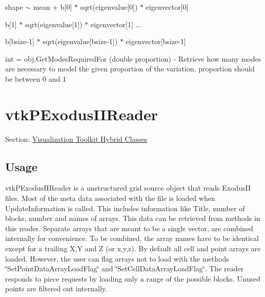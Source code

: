\begin{DoxyItemize}
shape $\sim$ mean + b\mbox{[}0\mbox{]} $\ast$ sqrt(eigenvalue\mbox{[}0\mbox{]}) $\ast$ eigenvector\mbox{[}0\mbox{]}
\begin{DoxyItemize}
\item b\mbox{[}1\mbox{]} $\ast$ sqrt(eigenvalue\mbox{[}1\mbox{]}) $\ast$ eigenvector\mbox{[}1\mbox{]} ...
\item b\mbox{[}bsize-\/1\mbox{]} $\ast$ sqrt(eigenvalue\mbox{[}bsize-\/1\mbox{]}) $\ast$ eigenvector\mbox{[}bsize-\/1\mbox{]}  
\end{DoxyItemize}
\item {\ttfamily int = obj.\-Get\-Modes\-Required\-For (double proportion)} -\/ Retrieve how many modes are necessary to model the given proportion of the variation. proportion should be between 0 and 1  
\end{DoxyItemize}\hypertarget{vtkhybrid_vtkpexodusiireader}{}\section{vtk\-P\-Exodus\-I\-I\-Reader}\label{vtkhybrid_vtkpexodusiireader}
Section\-: \hyperlink{sec_vtkhybrid}{Visualization Toolkit Hybrid Classes} \hypertarget{vtkwidgets_vtkxyplotwidget_Usage}{}\subsection{Usage}\label{vtkwidgets_vtkxyplotwidget_Usage}
vtk\-P\-Exodus\-I\-I\-Reader is a unstructured grid source object that reads Exodus\-I\-I files. Most of the meta data associated with the file is loaded when Update\-Information is called. This includes information like Title, number of blocks, number and names of arrays. This data can be retrieved from methods in this reader. Separate arrays that are meant to be a single vector, are combined internally for convenience. To be combined, the array names have to be identical except for a trailing X,Y and Z (or x,y,z). By default all cell and point arrays are loaded. However, the user can flag arrays not to load with the methods \char`\"{}\-Set\-Point\-Data\-Array\-Load\-Flag\char`\"{} and \char`\"{}\-Set\-Cell\-Data\-Array\-Load\-Flag\char`\"{}. The reader responds to piece requests by loading only a range of the possible blocks. Unused points are filtered out internally.

